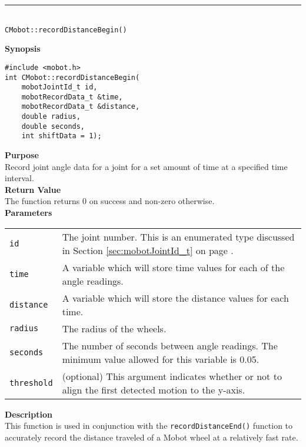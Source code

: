 \noindent
\vspace{5pt}
\rule{4.5in}{0.015in}\\
\noindent
{\LARGE \texttt{CMobot::recordDistanceBegin()}}\\
{}

\noindent
{\bf Synopsis}
\vspace{-8pt}
\begin{verbatim}
#include <mobot.h>
int CMobot::recordDistanceBegin(
    mobotJointId_t id, 
    mobotRecordData_t &time, 
    mobotRecordData_t &distance, 
    double radius,
    double seconds, 
    int shiftData = 1);
\end{verbatim}

\noindent
{\bf Purpose}\\
Record joint angle data for a joint for a set amount of time at a specified time interval.\\

\noindent
{\bf Return Value}\\
The function returns 0 on success and non-zero otherwise.\\

\noindent
{\bf Parameters}\\
\vspace{-0.1in}
\begin{description}
\item               
\begin{tabular}{p{15 mm}p{145 mm}}
\texttt{id} & The joint number. This is an enumerated type 
discussed in Section \ref{sec:mobotJointId_t} on page
\pageref{sec:mobotJointId_t}.\\
\texttt{time} & A variable which will store time values for each of the angle readings. \\
\texttt{distance} & A variable which will store the distance values for each time. \\
\texttt{radius} & The radius of the wheels. \\
\texttt{seconds} & The number of seconds between angle readings. The minimum value allowed for
this variable is 0.05. \\
\texttt{threshold} & (optional) This argument indicates whether or not to align the first
detected motion to the y-axis. 
\end{tabular}
\end{description}

\noindent
{\bf Description}\\
This function is used in conjunction with the \texttt{recordDistanceEnd()}
function to accurately record the distance traveled of a Mobot wheel at a relatively fast
rate. 

